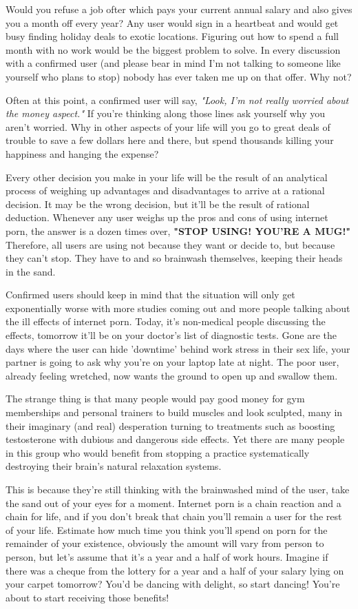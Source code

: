 \documentclass[easypeasy.tex]{subfiles}
\begin{document}
Would you refuse a job ofter which pays your current annual salary and also gives you a month off every year? Any user would sign in a heartbeat and would get busy finding holiday deals to exotic locations. Figuring out how to spend a full month with no work would be the biggest problem to solve. In every discussion with a confirmed user (and please bear in mind I'm not talking to someone like yourself who plans to stop) nobody has ever taken me up on that offer. Why not?

Often at this point, a confirmed user will say, \textit{"Look, I'm not really worried about the money aspect."} If you're thinking along those lines ask yourself why you aren't worried. Why in other aspects of your life will you go to great deals of trouble to save a few dollars here and there, but spend thousands killing your happiness and hanging the expense?

Every other decision you make in your life will be the result of an analytical process of weighing up advantages and disadvantages to arrive at a rational decision. It may be the wrong decision, but it'll be the result of rational deduction. Whenever any user weighs up the pros and cons of using internet porn, the answer is a dozen times over, \textbf{"STOP USING! YOU'RE A MUG!"} Therefore, all users are using not because they want or decide to, but because they can't stop. They have to and so brainwash themselves, keeping their heads in the sand.

Confirmed users should keep in mind that the situation will only get exponentially worse with more studies coming out and more people talking about the ill effects of internet porn. Today, it's non-medical people discussing the effects, tomorrow it'll be on your doctor's list of diagnostic tests. Gone are the days where the user can hide 'downtime' behind work stress in their sex life, your partner is going to ask why you're on your laptop late at night. The poor user, already feeling wretched, now wants the ground to open up and swallow them.

The strange thing is that many people would pay good money for gym memberships and personal trainers to build muscles and look sculpted, many in their imaginary (and real) desperation turning to treatments such as boosting testosterone with dubious and dangerous side effects. Yet there are many people in this group who would benefit from stopping a practice systematically destroying their brain's natural relaxation systems.

This is because they're still thinking with the brainwashed mind of the user, take the sand out of your eyes for a moment. Internet porn is a chain reaction and a chain for life, and if you don't break that chain you'll remain a user for the rest of your life. Estimate how much time you think you'll spend on porn for the remainder of your existence, obviously the amount will vary from person to person, but let's assume that it's a year and a half of work hours. Imagine if there was a cheque from the lottery for a year and a half of your salary lying on your carpet tomorrow? You'd be dancing with delight, so start dancing! You're about to start receiving those benefits!
\end{document}
